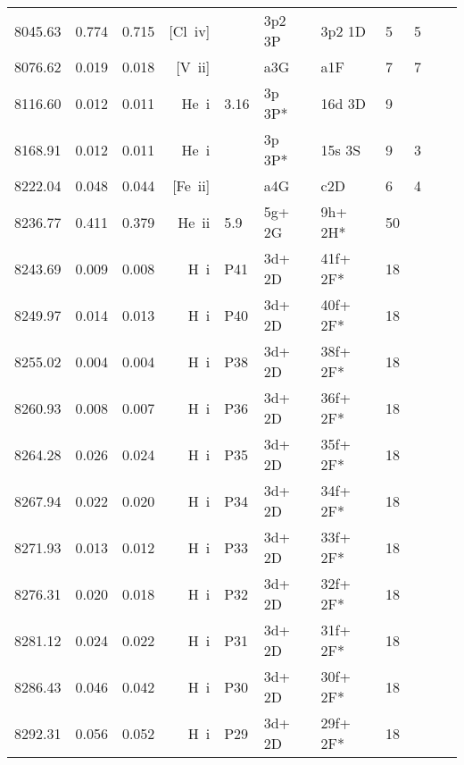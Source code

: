 \begin{longtable}{lrlrlllllll}
 8045.63 &   0.774 &   0.715 &   [Cl~{\sc iv}]  &            &  3p2 3P    &  3p2 1D    &          5 &        5    \\
 8076.62 &   0.019 &   0.018 & [V~{\sc ii}]     &            &  a3G       & a1F        &          7 &        7    \\
 8116.60 &   0.012 &   0.011 & He~{\sc i}       & 3.16       & 3p 3P*     & 16d 3D     &          9 &             \\
 8168.91 &   0.012 &   0.011 & He~{\sc i}       &            & 3p  3P*    & 15s 3S     &          9 &        3    \\
 8222.04 &   0.048 &   0.044 & [Fe~{\sc ii}]    &            & a4G        & c2D        &          6 &        4    \\
 8236.77 &   0.411 &   0.379 & He~{\sc ii}      & 5.9        & 5g+ 2G     & 9h+ 2H*    &         50 &             \\
 8243.69 &   0.009 &   0.008 & H~{\sc i}        & P41        & 3d+ 2D     & 41f+ 2F*   &         18 &             \\
 8249.97 &   0.014 &   0.013 & H~{\sc i}        & P40        & 3d+ 2D     & 40f+ 2F*   &         18 &             \\
 8255.02 &   0.004 &   0.004 & H~{\sc i}        & P38        & 3d+ 2D     & 38f+ 2F*   &         18 &             \\
 8260.93 &   0.008 &   0.007 & H~{\sc i}        & P36        & 3d+ 2D     & 36f+ 2F*   &         18 &             \\
 8264.28 &   0.026 &   0.024 & H~{\sc i}        & P35        & 3d+ 2D     & 35f+ 2F*   &         18 &             \\
 8267.94 &   0.022 &   0.020 & H~{\sc i}        & P34        & 3d+ 2D     & 34f+ 2F*   &         18 &             \\
 8271.93 &   0.013 &   0.012 & H~{\sc i}        & P33        & 3d+ 2D     & 33f+ 2F*   &         18 &             \\
 8276.31 &   0.020 &   0.018 & H~{\sc i}        & P32        & 3d+ 2D     & 32f+ 2F*   &         18 &             \\
 8281.12 &   0.024 &   0.022 & H~{\sc i}        & P31        & 3d+ 2D     & 31f+ 2F*   &         18 &             \\
 8286.43 &   0.046 &   0.042 & H~{\sc i}        & P30        & 3d+ 2D     & 30f+ 2F*   &         18 &             \\
 8292.31 &   0.056 &   0.052 & H~{\sc i}        & P29        & 3d+ 2D     & 29f+ 2F*   &         18 &             \\

\end{longtable}
